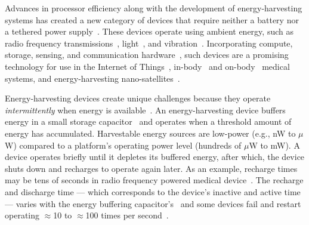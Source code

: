 Advances in processor efficiency along with the development of
energy-harvesting systems has created a new category of devices that require
neither a battery nor a tethered power
supply~\citep{prasad_comst_2014,lucia_snapl_2017,soyata_csm_2016}. These
devices operate using ambient energy, such as radio frequency
transmissions~\citep{rf_powered_computing_gollakota_2014},
light~\citep{margolies_infocom_2016,margolies_tosn_2016}, and
vibration~\citep{gorlatova_sigmetrics_2014}. Incorporating compute, storage,
sensing, and communication hardware~\citep{wisp5,moo,capybara}, such devices are a
promising technology for use in the Internet of Things~\citep{ku_cst_2016},
in-body~\citep{nadeau_naturebio_2017} and
on-body~\citep{bandodkar_electroanalysis_2015} medical systems, and
energy-harvesting nano-satellites~\citep{kicksat,capybara}.

Energy-harvesting devices create unique challenges because they operate {\em
intermittently} when energy is
available~\citep{hicks_isca_2017,lucia_snapl_2017}. An energy-harvesting device
buffers energy in a small storage capacitor~\citep{gorlatova_tmc_2013,gunduz_commag_2014} and operates when a
threshold amount of energy has accumulated. 
%
Harvestable energy sources are low-power (e.g., nW to $\mu$W) compared to a platform's operating
power level (hundreds of $\mu$W to mW). A device operates briefly until it depletes its buffered energy, after which, the device shuts
down and recharges to operate again later. As an example, recharge times may be
tens of seconds in radio frequency powered medical device~\cite[Fig.
3c]{nadeau_naturebio_2017}.  The recharge and discharge time --- which corresponds to the device's inactive and active time --- varies with the energy buffering capacitor's~\cite{capybara} and some devices fail and restart operating $\approx$10 to
$\approx$100 times per second~\citep{tan_infocom_2016,mementos,nvp}.


